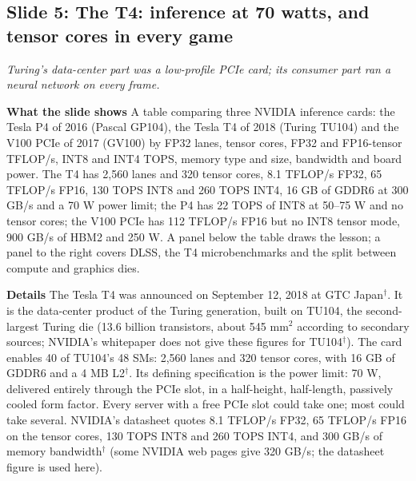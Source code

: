 \documentclass[11pt,letterpaper]{article}
\newcommand{\slide}[3]{%
  \subsection[Slide #1: #2]{Slide #1: #2}%
  {\color{muted}\itshape #3\par}\medskip}
\newcommand{\para}[1]{\medskip\noindent\textbf{#1}\quad}
\begin{document}
\slide{5}{The T4: inference at 70 watts, and tensor cores in every game}{Turing's data-center part was a low-profile PCIe card; its consumer part ran a neural network on every frame.}

\para{What the slide shows} A table comparing three NVIDIA inference cards: the Tesla P4 of 2016 (Pascal GP104), the Tesla T4 of 2018 (Turing TU104) and the V100 PCIe of 2017 (GV100) by FP32 lanes, tensor cores, FP32 and FP16-tensor TFLOP/s, INT8 and INT4 TOPS, memory type and size, bandwidth and board power. The T4 has 2,560 lanes and 320 tensor cores, 8.1 TFLOP/s FP32, 65 TFLOP/s FP16, 130 TOPS INT8 and 260 TOPS INT4, 16 GB of GDDR6 at 300 GB/s and a 70 W power limit; the P4 has 22 TOPS of INT8 at 50--75 W and no tensor cores; the V100 PCIe has 112 TFLOP/s FP16 but no INT8 tensor mode, 900 GB/s of HBM2 and 250 W. A panel below the table draws the lesson; a panel to the right covers DLSS, the T4 microbenchmarks and the split between compute and graphics dies.

\para{Details} The Tesla T4 was announced on September 12, 2018 at GTC Japan$^\dagger$. It is the data-center product of the Turing generation, built on TU104, the second-largest Turing die (13.6 billion transistors, about 545 mm$^2$ according to secondary sources; NVIDIA's whitepaper does not give these figures for TU104$^\dagger$). The card enables 40 of TU104's 48 SMs: 2,560 lanes and 320 tensor cores, with 16 GB of GDDR6 and a 4 MB L2$^\dagger$. Its defining specification is the power limit: 70 W, delivered entirely through the PCIe slot, in a half-height, half-length, passively cooled form factor. Every server with a free PCIe slot could take one; most could take several. NVIDIA's datasheet quotes 8.1 TFLOP/s FP32, 65 TFLOP/s FP16 on the tensor cores, 130 TOPS INT8 and 260 TOPS INT4, and 300 GB/s of memory bandwidth$^\dagger$ (some NVIDIA web pages give 320 GB/s; the datasheet figure is used here).
\end{document}
